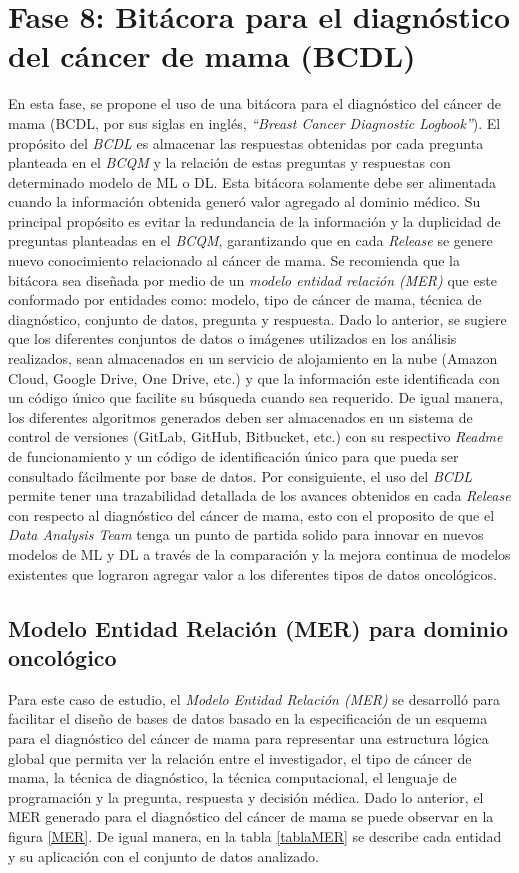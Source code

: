 \section{Fase 8: Bitácora para el diagnóstico del cáncer de mama (BCDL) }
En esta fase, se propone el uso de una bitácora para el diagnóstico del cáncer de mama (BCDL, por sus siglas en inglés, \textit{“Breast Cancer Diagnostic Logbook”}). El propósito del \textit{BCDL} es almacenar las respuestas obtenidas por cada pregunta planteada en el \textit{BCQM} y la relación de estas preguntas y respuestas con determinado modelo de ML o DL. Esta bitácora solamente debe ser alimentada cuando la información obtenida generó valor agregado al dominio médico. Su principal propósito es evitar la redundancia de la información y la duplicidad de preguntas planteadas en el \textit{BCQM}, garantizando que en cada \textit{Release} se genere nuevo conocimiento relacionado al cáncer de mama. Se recomienda que la bitácora sea diseñada por medio de un \textit{modelo entidad relación (MER)} que este conformado por entidades como: modelo, tipo de cáncer de mama, técnica de diagnóstico, conjunto de datos, pregunta y respuesta. Dado lo anterior, se sugiere que los diferentes conjuntos de datos o imágenes utilizados en los análisis realizados, sean almacenados en un servicio de alojamiento en la nube (Amazon Cloud, Google Drive, One Drive, etc.) y que la información este identificada con un código único que facilite su búsqueda cuando sea requerido. De igual manera, los diferentes algoritmos generados deben ser almacenados en un sistema de control de versiones (GitLab, GitHub, Bitbucket, etc.) con su respectivo \textit{Readme} de funcionamiento y un código de identificación único para que pueda ser consultado fácilmente por base de datos. Por consiguiente, el uso del \textit{BCDL} permite tener una trazabilidad detallada de los avances obtenidos en cada \textit{Release} con respecto al diagnóstico del cáncer de mama, esto con el proposito de que el \textit{Data Analysis Team} tenga un punto de partida solido para innovar en nuevos modelos de ML y DL a través de la comparación y la mejora continua de modelos existentes que lograron agregar valor a los diferentes tipos de datos oncológicos.

\subsection{Modelo Entidad Relación (MER) para dominio oncológico}

Para este caso de estudio, el \textit{Modelo Entidad Relación (MER)} se desarrolló para facilitar el diseño de bases de datos basado en la especificación de un esquema para el diagnóstico del cáncer de mama para representar una estructura lógica global que permita ver la relación entre el investigador, el tipo de cáncer de mama, la técnica de diagnóstico, la técnica computacional, el lenguaje de programación  y la pregunta, respuesta y decisión médica. Dado lo anterior, el MER generado para el diagnóstico del cáncer de mama se puede observar en la figura \ref{MER}. De igual manera, en la tabla \ref{tablaMER} se describe cada entidad y su aplicación con el conjunto de datos analizado. 

